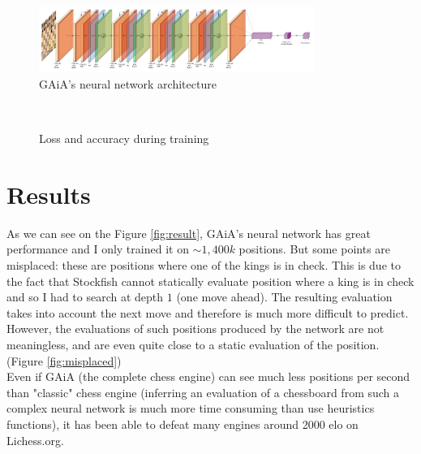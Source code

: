 \documentclass[unnumsec,webpdf,contemporary,large]{Article}%
\theoremstyle{thmstyleone}%
\theoremstyle{thmstyletwo}%
\theoremstyle{thmstylethree}%
\begin{document}
\begin{figure}[H]
  \centering
  \includegraphics[width=9cm]{network/network.pdf}
  \caption{GAiA's neural network architecture}
  \label{fig:model_archi}
\end{figure}

\begin{figure}[H]
  \captionsetup[subfigure]{labelformat=empty}
  \centering
  \\
  \caption{Loss and accuracy during training}
  \label{fig:history}
\end{figure}

\section{Results}
As we can see on the Figure \ref{fig:result}, GAiA's neural network
has great performance and I only trained it on $\sim 1,400k$ positions.
But some points are misplaced: these are positions where one of the kings is
in check. This is due to the fact that Stockfish cannot statically evaluate
position where a king is in check and so I had to search at depth $1$ (one move ahead).
The resulting evaluation takes into account the next move and therefore
is much more difficult to predict. However, the evaluations of
such positions produced by the network are not meaningless,
and are even quite close to a static evaluation of the position.
(Figure \ref{fig:misplaced})\\
Even if GAiA (the complete chess engine) can see much less positions
per second than "classic" chess engine (inferring an evaluation of a chessboard
from such a complex neural network is much more time consuming than
use heuristics functions), it has been able to defeat many engines
around 2000 elo on Lichess.org.
\end{document}
